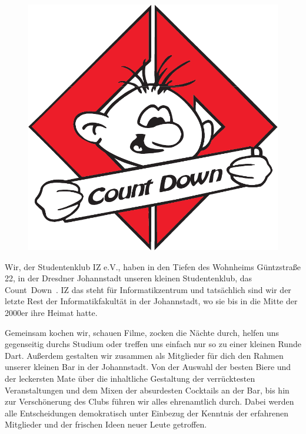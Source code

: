\begin{figure}%
  \vspace{-.5cm}
  \includegraphics[width=\linewidth]{img/countdown}
  \vspace{-1cm}
\end{figure}

Wir, der Studentenklub IZ e.V., haben in den Tiefen des Wohnheims Güntzstraße 22, in der Dresdner Johannstadt unseren kleinen Studentenklub, das Count~Down~.
IZ das steht für Informatikzentrum und tatsächlich sind wir der letzte Rest der Informatikfakultät in der Johannstadt, wo sie bis in die Mitte der 2000er ihre Heimat hatte.

Gemeinsam kochen wir, schauen Filme, zocken die Nächte durch, helfen uns gegenseitig durchs Studium oder treffen uns einfach nur so zu einer kleinen Runde Dart.
Außerdem gestalten wir zusammen als Mitglieder für dich den Rahmen unserer kleinen Bar in der Johannstadt.
Von der Auswahl der besten Biere und der leckersten Mate über die inhaltliche Gestaltung der verrücktesten Veranstaltungen und dem Mixen der absurdesten Cocktails an der Bar, bis hin zur Verschönerung des Clubs führen wir alles ehrenamtlich durch.
Dabei werden alle Entscheidungen demokratisch unter Einbezug der Kenntnis der erfahrenen Mitglieder und der frischen Ideen neuer Leute getroffen.

